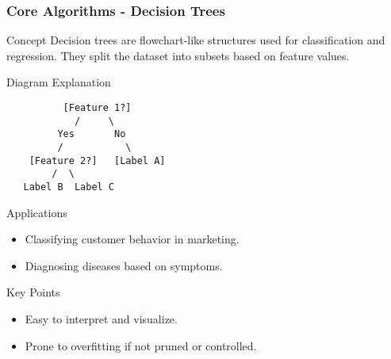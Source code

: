 \documentclass[aspectratio=169]{beamer}
\begin{document}
\begin{frame}[fragile]
    \frametitle{Core Algorithms - Decision Trees}
    \begin{block}{Concept}
        Decision trees are flowchart-like structures used for classification and regression. They split the dataset into subsets based on feature values.
    \end{block}
    
    \begin{block}{Diagram Explanation}
        \begin{verbatim}
          [Feature 1?]
            /     \
         Yes       No
         /           \
    [Feature 2?]   [Label A]
        /  \
   Label B  Label C
        \end{verbatim}
    \end{block}
    
    \begin{block}{Applications}
        \begin{itemize}
            \item Classifying customer behavior in marketing.
            \item Diagnosing diseases based on symptoms. 
        \end{itemize}
    \end{block}

    \begin{block}{Key Points}
        \begin{itemize}
            \item Easy to interpret and visualize.
            \item Prone to overfitting if not pruned or controlled.
        \end{itemize}
    \end{block}
\end{frame}
\end{document}
